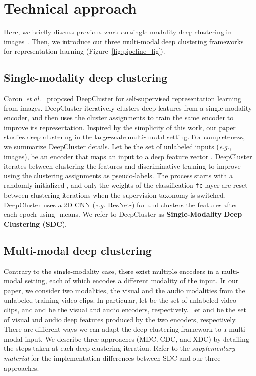 \documentclass{article}
\begin{document}
\vspace{-1pt}
\section{Technical approach}
\vspace{-3pt}

\label{sec:technical_appraoch}
Here, we briefly discuss previous work on single-modality deep clustering in images~\cite{caron2018deep}. Then, we introduce our three multi-modal deep clustering frameworks for representation learning (Figure~\ref{fig:pipeline_fig}).

\vspace{-3pt}
\subsection{Single-modality deep clustering}
\vspace{-3pt}

Caron~\emph{et al.}~\cite{caron2018deep} proposed DeepCluster for self-supervised representation learning from images. DeepCluster iteratively clusters deep features from a single-modality encoder, and then uses the cluster assignments to train the same encoder to improve its representation. Inspired by the simplicity of this work, our paper studies deep clustering in the large-scale multi-modal setting.  
For completeness, we summarize DeepCluster details.
Let  be the set of unlabeled inputs (\emph{e.g.}, images),  be an encoder that maps an input  to a deep feature vector . DeepCluster iterates between clustering the features  and discriminative training to improve  using the clustering assignments as pseudo-labels. The process starts with a randomly-initialized , and only the weights of the classification \texttt{fc}-layer are reset between clustering iterations when the supervision-taxonomy is switched. DeepCluster uses a 2D CNN (\emph{e.g.} ResNet-) for  and clusters the features after each epoch using -means. We refer to DeepCluster as \textbf{Single-Modality Deep Clustering (SDC)}.

\vspace{-2pt}
\subsection{Multi-modal deep clustering}
\vspace{-3pt}

Contrary to the single-modality case, there exist multiple encoders in a multi-modal setting, each of which encodes a different modality of the input. In our paper, we consider two modalities, the visual and the audio modalities from the unlabeled training video clips. In particular, let  be the set of unlabeled video clips, and  and  be the visual and audio encoders, respectively.  Let  and  be the set of visual and audio deep features produced by the two encoders, respectively. There are different ways we can adapt the deep clustering framework to a multi-modal input. We describe three approaches (MDC, CDC, and XDC) by detailing the steps taken at each deep clustering iteration. Refer to the \emph{supplementary material} for the implementation differences between SDC and our three approaches.
\end{document}
